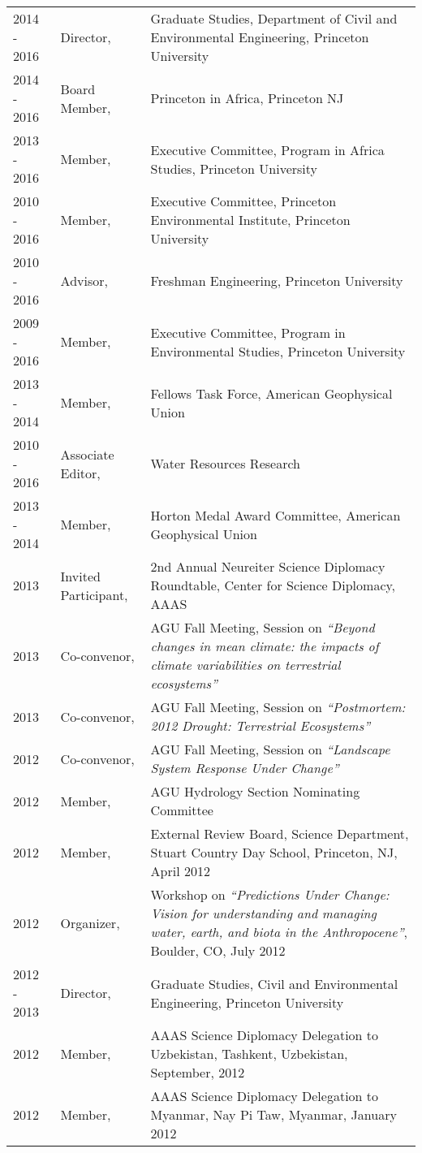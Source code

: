 \documentclass[10pt]{report}
\begin{document}
\begin{longtable}{p{.75in} p{1.1in} p{4.2in}}
2014 - 2016 & Director, & Graduate Studies, Department of Civil and Environmental Engineering, Princeton University \\
2014 - 2016 & Board Member, & Princeton in Africa, Princeton NJ \\
2013 - 2016 & Member, & Executive Committee, Program in Africa Studies, Princeton University \\
2010 - 2016 & Member, & Executive Committee, Princeton Environmental Institute, Princeton University \\
2010 - 2016 & Advisor, & Freshman Engineering, Princeton University \\ 
2009 - 2016 & Member, &  Executive Committee, Program in Environmental Studies, Princeton University \\
2013 - 2014 & Member, & Fellows Task Force, American Geophysical Union \\ 
2010 - 2016 & Associate Editor, & Water Resources Research \\ 
2013 - 2014 & Member, & Horton Medal Award Committee, American Geophysical Union \\ 
2013 & Invited Participant, & 2nd Annual Neureiter Science Diplomacy Roundtable, Center for Science Diplomacy, AAAS \\
2013 & Co-convenor, & AGU Fall Meeting, Session on \emph{``Beyond changes in mean climate: the impacts of climate variabilities on terrestrial ecosystems''}\\
2013 & Co-convenor, & AGU Fall Meeting, Session on \emph{``Postmortem: 2012 Drought: Terrestrial Ecosystems''}\\
2012 & Co-convenor, & AGU Fall Meeting, Session on \emph{``Landscape System Response Under Change''} \\
2012 & Member, & AGU Hydrology Section Nominating Committee \\ 
2012 & Member, & External Review Board, Science Department, Stuart Country Day School, Princeton, NJ, April 2012 \\ 
2012 & Organizer, & Workshop on \emph{``Predictions Under Change: Vision for understanding and managing water, earth, and biota in the Anthropocene''}, Boulder, CO, July 2012 \\ 
2012 - 2013 & Director, & Graduate Studies, Civil and Environmental Engineering, Princeton University \\ 
2012 & Member, & AAAS Science Diplomacy Delegation to Uzbekistan, Tashkent, Uzbekistan, September, 2012 \\ 
2012 & Member, & AAAS Science Diplomacy Delegation to Myanmar, Nay Pi Taw, Myanmar, January 2012 \\

\end{longtable}
\end{document}
